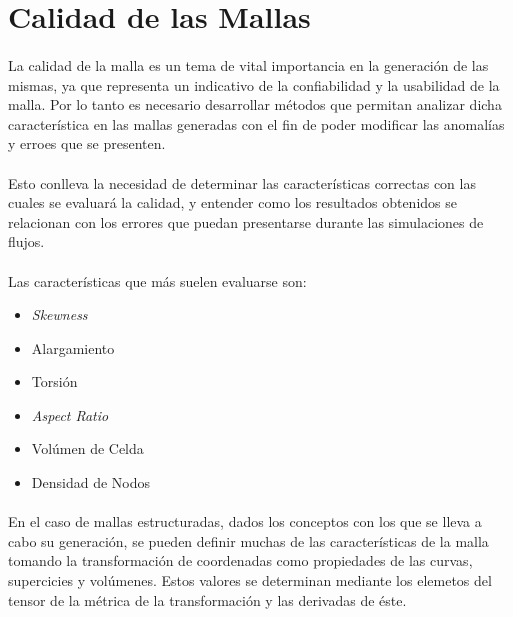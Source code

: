 \documentclass[letterpaper, openright, 12pt]{book}
\begin{document}
    \section{Calidad de las Mallas}
    \paragraph*{}
    La calidad de la malla es un tema de vital importancia en la generación
    de las mismas, ya que representa un indicativo de la confiabilidad y la
    usabilidad de la malla. Por lo tanto es necesario desarrollar métodos
    que permitan analizar dicha característica en las mallas generadas con
    el fin de poder modificar las anomalías y erroes que se presenten.

    \paragraph*{}
    Esto conlleva la necesidad de determinar las características correctas
    con las cuales se evaluará la calidad, y entender como los resultados
    obtenidos se relacionan con los errores que puedan presentarse durante
    las simulaciones de flujos.

    \paragraph*{}
    Las características que más suelen evaluarse son:
    \begin{itemize}
        \item \it{Skewness}
        \item Alargamiento
        \item Torsión
        \item \it{Aspect Ratio}
        \item Volúmen de Celda
        \item Densidad de Nodos
    \end{itemize}

    \paragraph*{}
    En el caso de mallas estructuradas, dados los conceptos con los que se
    lleva a cabo su generación, se pueden definir muchas de las
    características de la malla tomando la transformación de coordenadas
    como propiedades de las curvas, supercicies y volúmenes. Estos valores
    se determinan mediante los elemetos del tensor de la métrica de la
    transformación y las derivadas de éste. \cite{vladimir-grid}
\end{document}
